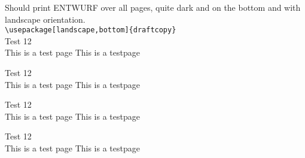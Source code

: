 \documentclass[landscape,german,a4paper]{article}
\newcommand{\xx}{
Test 12\\This is a test page \thepage \vfill
This is a testpage \thepage \newpage
}
\begin{document}
Should print ENTWURF over all pages, quite dark and on the bottom and with
landscape orientation.\\
\verb|\usepackage[landscape,bottom]{draftcopy}|\\
\xx\xx\xx\xx
\end{document}
